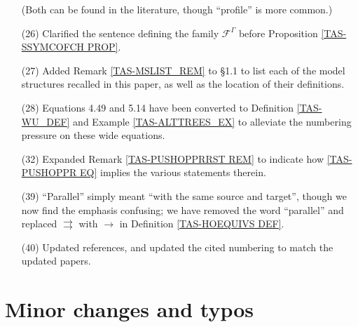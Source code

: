 \documentclass[a4paper,10pt
]{article}%
\numberwithin{equation}{section}
\numberwithin{figure}{section}
\theoremstyle{definition} %
\newcommand{\1}{\ensuremath{\mathbbm 1}}%
\begin{document}
\begin{enumerate}
        (Both can be found in the literature, though ``profile'' is more common.)
\item[(26)] Clarified the sentence defining the family $\mathcal F^\Gamma$ before Proposition \ref{TAS-SSYMCOFCH PROP}.
\item[(27)] Added Remark \ref{TAS-MSLIST_REM} to \S 1.1 to list each of the model structures recalled in this paper, as well as the location of their definitions.
\item[(28)] Equations 4.49 and 5.14 have been converted to Definition \ref{TAS-WU_DEF} and Example \ref{TAS-ALTTREES_EX} to alleviate the numbering pressure on these wide equations.
\item[(32)] Expanded Remark \ref{TAS-PUSHOPPRRST REM} to indicate how \eqref{TAS-PUSHOPPR EQ} implies the various statements therein.
\item[(39)] ``Parallel'' simply meant ``with the same source and target'', though we now find the emphasis confusing; we have removed the word ``parallel'' and replaced $\rightrightarrows$ with $\to$ in Definition \ref{TAS-HOEQUIVS DEF}.         
\item[(40)] Updated references, and updated the cited numbering to match the updated papers.
\end{enumerate}



\section{Minor changes and typos}
 
\end{document}
